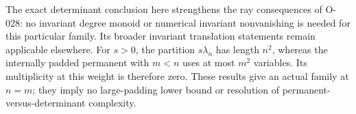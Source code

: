 The exact determinant conclusion here strengthens
the ray consequences of O-028: no invariant degree
monoid or numerical invariant nonvanishing is needed
for this particular family. Its broader invariant
translation statements remain applicable elsewhere.
For \(s>0\), the partition \(s\lambda_n\) has length
\(n^2\), whereas the internally padded permanent
with \(m<n\) uses at most \(m^2\) variables.
Its multiplicity at this weight is therefore zero.
These results give an actual family at \(n=m\);
they imply no large-padding lower bound or resolution
of permanent-versus-determinant complexity.
